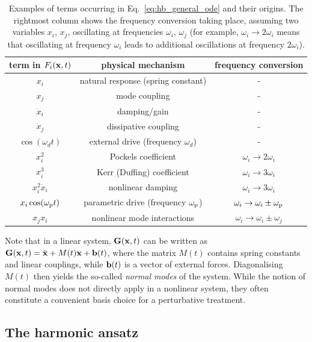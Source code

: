 \begin{table}[t] 
	\centering
	\caption{Examples of terms occurring in Eq.~\eqref{eq:hb_general_ode} and their origins. The rightmost column shows the frequency conversion taking place, assuming two variables $x_i$, $x_j$, oscillating at frequencies $\omega_i$, $\omega_j$ (for example, $\omega_i \rightarrow 2\omega_i$ means that oscillating at frequency $\omega_i$ leads to additional oscillations at frequency $2\omega_i$).}
	\label{table:hb_terms}
	\begin{tabular}{ |c|c|c| } 
		\hline
		term in $F_i(\vb{x}, t)$ & physical mechanism & frequency conversion \\ \hline
		$x_i$ & natural response (spring constant) & - \\
		$x_j$ & mode coupling & - \\
		$\dot{x}_i$ & damping/gain & -\\
		$\dot{x}_j$ & dissipative coupling & -\\
		$\cos(\omega_d t)$ & external drive (frequency $\omega_d$) & -\\
		$x_i^2$ & Pockels coefficient & $\omega_i \rightarrow 2\omega_i$ \\ 
		$x_i^3$ & Kerr (Duffing) coefficient & $\omega_i \rightarrow 3 \omega_i$ \\ 
		$x_i^2 \dot{x}_i$ & nonlinear damping & $\omega_i \rightarrow 3 \omega_i$\\ 
		$x_i \cos(\omega_{\rm p} t)$ & parametric drive (frequency $\omega_{\rm p}$) & $\omega_i \rightarrow \omega_i \pm \omega_{\rm p}$\\
		$x_j x_i $ & nonlinear mode interactions & $\omega_i \rightarrow \omega_i \pm \omega_j$\\ 
		\hline
	\end{tabular}
\end{table}

Note that in a linear system, $\vb{G}(\vb{x}, t)$ can be written as $\vb{G}(\vb{x}, t)= \ddot{\vb{x}} + M(t) \vb{x}+ \textbf{b}(t)$, where the matrix $M(t)$ contains spring constants and linear couplings, while $\vb{b}(t)$ is a vector of external forces. Diagonalising $M(t)$ then yields the so-called \textit{normal modes} of the system. While the notion of normal modes does not directly apply in a nonlinear system, they often constitute a convenient basis choice for a perturbative treatment.

\subsection{The harmonic ansatz}\label{sec:harm_exp}

